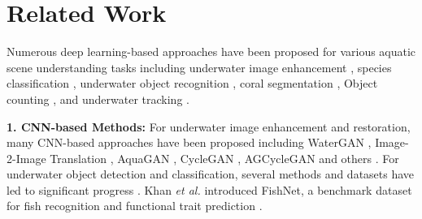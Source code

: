 \section{Related Work}
\label{sec:relatedwork}
Numerous deep learning-based approaches have been proposed for various aquatic scene understanding tasks \cite{saleh2022computer, wang2023deep, zhang2024webuot, li2023underwater, gonzalez2023survey} including underwater image enhancement  \cite{desai2022aquagan, wang2022agcyclegan, islam2020fast}, species classification \cite{li2023deep, xu2023systematic}, underwater object recognition \cite{khan2023fishnet, jalal2020fish}, coral segmentation \cite{zheng2024coralscop}, Object counting \cite{sun2023indiscernible}, and underwater tracking \cite{zhang2024webuot}.

\noindent \textbf{1. CNN-based Methods:} %
For underwater image enhancement and restoration, many CNN-based approaches have been proposed including WaterGAN \cite{li2017watergan}, Image-2-Image Translation \cite{cho2020underwater}, AquaGAN \cite{desai2022aquagan}, CycleGAN \cite{lu2019multi}, AGCycleGAN \cite{wang2022agcyclegan} and others \cite{hu2018underwater}.
For underwater object detection and classification, several methods and datasets have led to significant progress \cite{khan2023fishnet, yeh2021lightweight, jalal2020fish}. 
Khan \textit{et al.} introduced FishNet, a benchmark dataset for fish recognition and functional trait prediction \cite{khan2023fishnet}.

